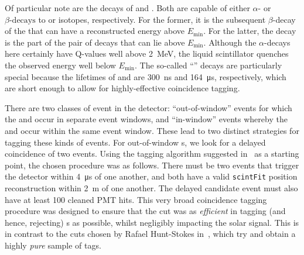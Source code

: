 \begin{figure}
    \centering
    \caption[]{}
    \label{fig:u_th_decay_chains}
\end{figure}

Of particular note are the decays of  and . Both are capable of either $\alpha\textrm{-}$ or $\beta\textrm{-decays}$ to  or  isotopes, respectively. For the former, it is the subsequent $\beta$-decay of the  that can have a reconstructed energy above $E_{\textrm{min}}$. For the latter, the  decay is the part of the pair of decays that can lie above $E_{\textrm{min}}$. Although the $\alpha$-decays here certainly have Q-values well above \SI{2}{\MeV}, the liquid scintillator quenches the observed energy well below $E_{\mathrm{min}}$. The so-called ``'' decays are particularly special because the lifetimes of  and  are \SI{300}{\nano\second} and \SI{164}{\micro\second}, respectively, which are short enough to allow for highly-effective coincidence tagging.

There are two classes of  event in the detector: ``out-of-window'' events for which the  and  occur in separate event windows, and ``in-window'' events whereby the  and  occur within the same event window. These lead to two distinct strategies for tagging these kinds of events. For out-of-window s, we look for a delayed coincidence of two events. Using the tagging algorithm suggested in~\cite{} %
as a starting point, the chosen procedure was as follows. There must be two events that trigger the detector within \SI{4}{\micro\second} of one another, and both have a valid \texttt{scintFit} position reconstruction within \SI{2}{\metre} of one another. The delayed candidate event must also have at least 100 cleaned PMT hits. %
This very broad coincidence tagging procedure was designed to ensure that the cut was as \textit{efficient} in tagging (and hence, rejecting) s as possible, whilst negligibly impacting the solar signal. This is in contrast to the cuts chosen by Rafael Hunt-Stokes in~\cite{}, %
which try and obtain a highly \textit{pure} sample of  tags.

